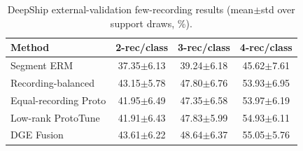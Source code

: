\begin{table}[t]
\centering
\caption{DeepShip external-validation few-recording results (mean$\pm$std over support draws, \%).}
\begin{tabular}{lccc}
\hline
Method & 2-rec/class & 3-rec/class & 4-rec/class \\
\hline
Segment ERM & 37.35$\pm$6.13 & 39.24$\pm$6.18 & 45.62$\pm$7.61 \\
Recording-balanced & 43.15$\pm$5.78 & 47.80$\pm$6.76 & 53.93$\pm$6.95 \\
Equal-recording Proto & 41.95$\pm$6.49 & 47.35$\pm$6.58 & 53.97$\pm$6.19 \\
Low-rank ProtoTune & 41.91$\pm$6.43 & 47.83$\pm$5.99 & 54.93$\pm$6.11 \\
DGE Fusion & 43.61$\pm$6.22 & 48.64$\pm$6.37 & 55.05$\pm$5.76 \\
\hline
\end{tabular}
\label{tab:deepship_external}
\end{table}
